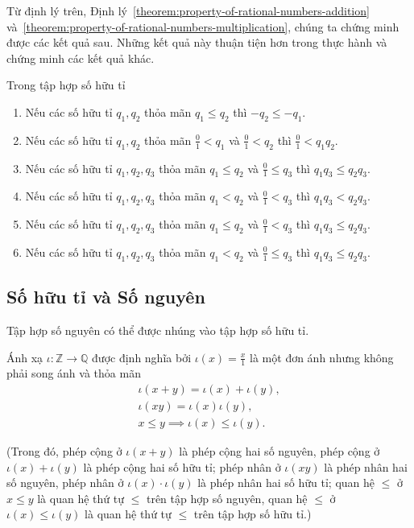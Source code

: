 Từ định lý trên, Định lý~\ref{theorem:property-of-rational-numbers-addition} và~\ref{theorem:property-of-rational-numbers-multiplication}, chúng ta chứng minh được các kết quả sau. Những kết quả này thuận tiện hơn trong thực hành và chứng minh các kết quả khác.
\begin{theorem}\label{theorem:rational-numbers-order-and-operations-sequel}
    Trong tập hợp số hữu tỉ
    \begin{enumerate}[label={(\roman*)}]
        \item Nếu các số hữu tỉ $q_{1}, q_{2}$ thỏa mãn $q_{1}\leq q_{2}$ thì $-q_{2}\leq -q_{1}$.
        \item Nếu các số hữu tỉ $q_{1}, q_{2}$ thỏa mãn $\frac{0}{1} < q_{1}$ và $\frac{0}{1} < q_{2}$ thì $\frac{0}{1} < q_{1}q_{2}$.
        \item Nếu các số hữu tỉ $q_{1}, q_{2}, q_{3}$ thỏa mãn $q_{1}\leq q_{2}$ và $\frac{0}{1}\leq q_{3}$ thì $q_{1}q_{3}\leq q_{2}q_{3}$.
        \item Nếu các số hữu tỉ $q_{1}, q_{2}, q_{3}$ thỏa mãn $q_{1} < q_{2}$ và $\frac{0}{1} < q_{3}$ thì $q_{1}q_{3} < q_{2}q_{3}$.
        \item Nếu các số hữu tỉ $q_{1}, q_{2}, q_{3}$ thỏa mãn $q_{1}\leq q_{2}$ và $\frac{0}{1} < q_{3}$ thì $q_{1}q_{3}\leq q_{2}q_{3}$.
        \item Nếu các số hữu tỉ $q_{1}, q_{2}, q_{3}$ thỏa mãn $q_{1} < q_{2}$ và $\frac{0}{1}\leq q_{3}$ thì $q_{1}q_{3}\leq q_{2}q_{3}$.
    \end{enumerate}
\end{theorem}

\subsection{Số hữu tỉ và Số nguyên}

Tập hợp số nguyên có thể được nhúng vào tập hợp số hữu tỉ.
\begin{theorem}\label{theorem:embed-Z-into-Q}
    Ánh xạ $\iota: \mathbb{Z}\to \mathbb{Q}$ được định nghĩa bởi $\iota(x) = \frac{x}{1}$ là một đơn ánh nhưng không phải song ánh và thỏa mãn
    \[
        \begin{split}
            \iota(x + y) = \iota(x) + \iota(y), \\
            \iota(xy) = \iota(x)\iota(y), \\
            x\leq y \implies \iota(x)\leq \iota(y).
        \end{split}
    \]

    (Trong đó, phép cộng ở $\iota(x + y)$ là phép cộng hai số nguyên, phép cộng ở $\iota(x) + \iota(y)$ là phép cộng hai số hữu tỉ; phép nhân ở $\iota(xy)$ là phép nhân hai số nguyên, phép nhân ở $\iota(x)\cdot\iota(y)$ là phép nhân hai số hữu tỉ; quan hệ $\leq$ ở $x\leq y$ là quan hệ thứ tự $\leq$ trên tập hợp số nguyên, quan hệ $\leq$ ở $\iota(x)\leq \iota(y)$ là quan hệ thứ tự $\leq$ trên tập hợp số hữu tỉ.)
\end{theorem}

